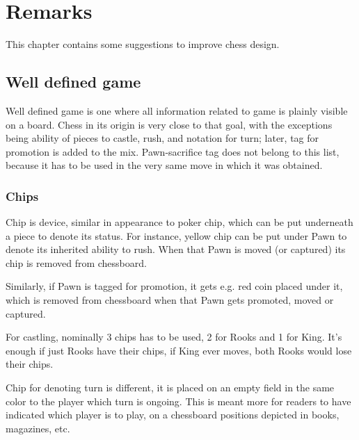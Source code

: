 

\chapter*{Remarks}
\label{ch:Remarks}

This chapter contains some suggestions to improve chess design.

\section*{Well defined game}
\label{sec:Remarks/Well defined game}

Well defined game is one where all information related to game is plainly
visible on a board. Chess in its origin is very close to that goal, with
the exceptions being ability of pieces to castle, rush, and notation for
turn; later, tag for promotion is added to the mix. Pawn-sacrifice tag
does not belong to this list, because it has to be used in the very same
move in which it was obtained.

\subsection*{Chips}
\label{sec:Remarks/Chips}

Chip is device, similar in appearance to poker chip, which can be put
underneath a piece to denote its status. For instance, yellow chip can be
put under Pawn to denote its inherited ability to rush. When that Pawn is
moved (or captured) its chip is removed from chessboard.

Similarly, if Pawn is tagged for promotion, it gets e.g. red coin placed
under it, which is removed from chessboard when that Pawn gets promoted,
moved or captured.

For castling, nominally 3 chips has to be used, 2 for Rooks and 1 for King.
It's enough if just Rooks have their chips, if King ever moves, both Rooks
would lose their chips.

Chip for denoting turn is different, it is placed on an empty field in the
same color to the player which turn is ongoing. This is meant more for
readers to have indicated which player is to play, on a chessboard positions
depicted in books, magazines, etc.

